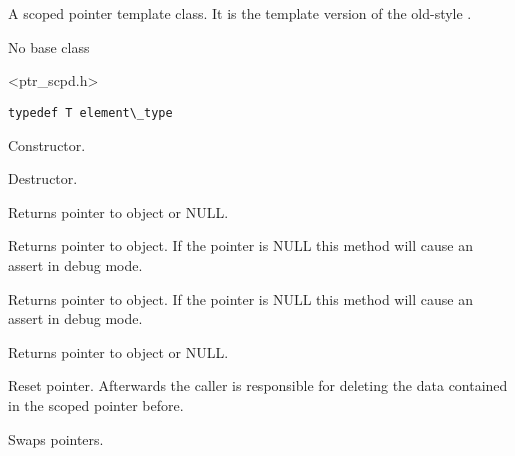\section{}\label{wxscopedptrtemplate}

A scoped pointer template class. It is the template version of
the old-style .


No base class


<ptr\_scpd.h>


{\small \begin{verbatim}
typedef T element\_type
\end{verbatim}}



\label{wxscopedptrtemplatewxscopedptrtemplate}


Constructor.

\label{wxscopedptrtemplatedtor}


Destructor.

\label{wxscopedptrtemplateget}


Returns pointer to object or NULL.

\label{wxscopedptrtemplateoperatorptrt}


Returns pointer to object. If the pointer is NULL this method will 
cause an assert in debug mode.

\label{wxscopedptrtemplateoperatorderef}


Returns pointer to object. If the pointer is NULL this method will 
cause an assert in debug mode.

\label{wxscopedptrtemplaterelease}


Returns pointer to object or NULL.

\label{wxscopedptrtemplatereset}


Reset pointer. Afterwards the caller is responsible for deleting
the data contained in the scoped pointer before.

\label{wxscopedptrtemplateswap}


Swaps pointers.

